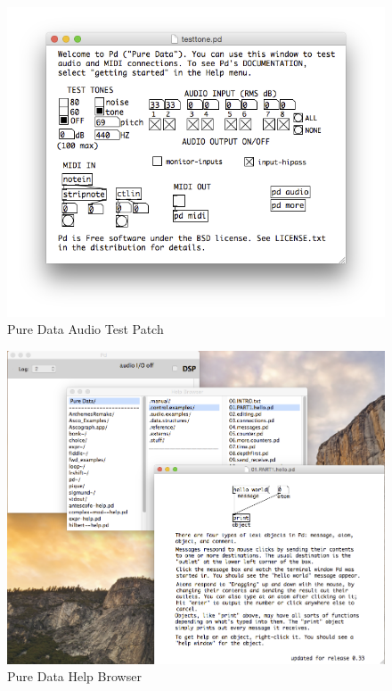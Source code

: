 \documentclass[onecolumn,nocopyrightspace,preprint]{sigplanconf}
\begin{document}
\begin{figure}[ht]
    \centering
    \includegraphics[scale=0.4]{fig/pd-test.png}
    \caption{Pure Data Audio Test Patch}
    \label{fig:pd-test}
\end{figure}

\begin{figure}[ht]
    \centering
    \includegraphics[scale=0.4]{fig/pd-help-browser.png}
    \caption{Pure Data Help Browser}
    \label{fig:pd-help-browser}
\end{figure}
\end{document}
